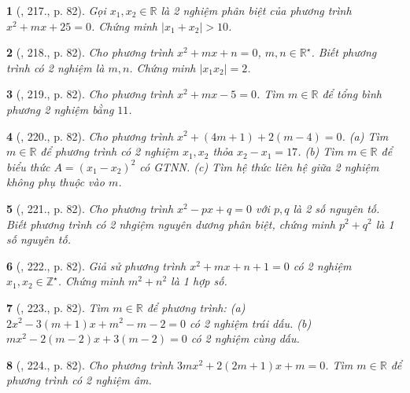 \documentclass{article}
\newtheorem{baitoan}{}
\begin{document}
\begin{baitoan}[\cite{Tuyen_Toan_9_old}, 217., p. 82]
	Gọi $x_1,x_2\in\mathbb{R}$ là 2 nghiệm phân biệt của phương trình $x^2 + mx + 25 = 0$. Chứng minh $|x_1 + x_2| > 10$.
\end{baitoan}

\begin{baitoan}[\cite{Tuyen_Toan_9_old}, 218., p. 82]
	Cho phương trình $x^2 + mx + n = 0$, $m,n\in\mathbb{R}^\star$. Biết phương trình có 2 nghiệm là $m,n$. Chứng minh $|x_1x_2| = 2$.
\end{baitoan}

\begin{baitoan}[\cite{Tuyen_Toan_9_old}, 219., p. 82]
	Cho phương trình $x^2 + mx - 5 = 0$. Tìm $m\in\mathbb{R}$ để tổng bình phương 2 nghiệm bằng $11$.
\end{baitoan}

\begin{baitoan}[\cite{Tuyen_Toan_9_old}, 220., p. 82]
	Cho phương trình $x^2 + (4m + 1) + 2(m - 4) = 0$. (a) Tìm $m\in\mathbb{R}$ để phương trình có 2 nghiệm $x_1,x_2$ thỏa $x_2 - x_1 = 17$. (b) Tìm $m\in\mathbb{R}$ để biểu thức $A = (x_1 - x_2)^2$ có {\rm GTNN}. (c) Tìm hệ thức liên hệ giữa 2 nghiệm không phụ thuộc vào $m$.
\end{baitoan}

\begin{baitoan}[\cite{Tuyen_Toan_9_old}, 221., p. 82]
	Cho phương trình $x^2 - px + q = 0$ với $p,q$ là 2 số nguyên tố. Biết phương trình có 2 nhgiệm nguyên dương phân biệt, chứng minh $p^2 + q^2$ là 1 số nguyên tố.
\end{baitoan}

\begin{baitoan}[\cite{Tuyen_Toan_9_old}, 222., p. 82]
	Giả sử phương trình $x^2 + mx + n + 1 = 0$ có 2 nghiệm $x_1,x_2\in\mathbb{Z}^\star$. Chứng minh $m^2 + n^2$ là 1 hợp số.
\end{baitoan}

\begin{baitoan}[\cite{Tuyen_Toan_9_old}, 223., p. 82]
	Tìm $m\in\mathbb{R}$ để phương trình: (a) $2x^2 - 3(m + 1)x + m^2 - m - 2 = 0$ có 2 nghiệm trái dấu. (b) $mx^2 - 2(m - 2)x + 3(m - 2) = 0$ có 2 nghiệm cùng dấu.
\end{baitoan}

\begin{baitoan}[\cite{Tuyen_Toan_9_old}, 224., p. 82]
	Cho phương trình $3mx^2 + 2(2m + 1)x + m = 0$. Tìm $m\in\mathbb{R}$ để phương trình có 2 nghiệm âm.
\end{baitoan}
\end{document}
